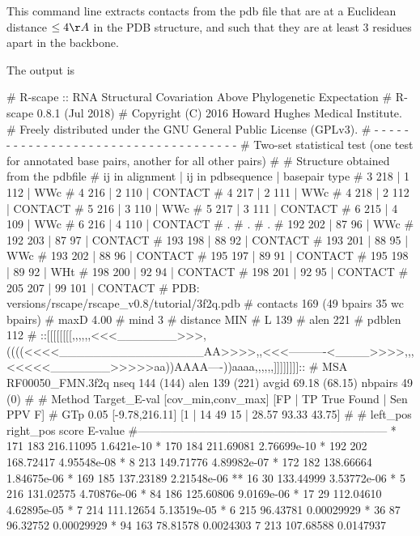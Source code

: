 \noindent
This command line extracts contacts from the pdb file that are at a
Euclidean distance $\leq 4 \AA$ in the PDB structure, and such that
they are at least 3 residues apart in the backbone.


\noindent
The output is

\begin{sreoutput}
# R-scape :: RNA Structural Covariation Above Phylogenetic Expectation
# R-scape 0.8.1 (Jul 2018)
# Copyright (C) 2016 Howard Hughes Medical Institute.
# Freely distributed under the GNU General Public License (GPLv3).
# - - - - - - - - - - - - - - - - - - - - - - - - - - - - - - - - - - - -
# Two-set statistical test (one test for annotated base pairs, another for all other pairs)
#
# Structure obtained from the pdbfile
# ij in alignment | ij in pdbsequence | basepair type
# 3 218 | 1 112 | WWc
# 4 216 | 2 110 | CONTACT
# 4 217 | 2 111 | WWc
# 4 218 | 2 112 | CONTACT
# 5 216 | 3 110 | WWc
# 5 217 | 3 111 | CONTACT
# 6 215 | 4 109 | WWc
# 6 216 | 4 110 | CONTACT
# .
# .
# .
# 192 202 | 87 96 | WWc
# 192 203 | 87 97 | CONTACT
# 193 198 | 88 92 | CONTACT
# 193 201 | 88 95 | WWc
# 193 202 | 88 96 | CONTACT
# 195 197 | 89 91 | CONTACT
# 195 198 | 89 92 | WHt
# 198 200 | 92 94 | CONTACT
# 198 201 | 92 95 | CONTACT
# 205 207 | 99 101 | CONTACT
# PDB:      versions/rscape/rscape_v0.8/tutorial/3f2q.pdb
# contacts  169 (49 bpairs 35 wc bpairs)
# maxD      4.00
# mind      3
# distance  MIN
# L         139
# alen      221
# pdblen    112
# ::[[[[[[[[,,,,,,<<<_______>>>,((((<<<<_________________AA>>>>,,<<<----------<____>>>>,,,<<<<<_______>>>>>aa))AAAA----))aaaa,,,,,,]]]]]]]]::
# MSA RF00050_FMN.3f2q nseq 144 (144) alen 139 (221) avgid 69.18 (68.15) nbpairs 49 (0)
#
# Method Target_E-val [cov_min,conv_max] [FP | TP True Found | Sen PPV F] 
# GTp    0.05         [-9.78,216.11]     [1 | 14 49 15 | 28.57 93.33 43.75] 
#
#       left_pos       right_pos        score           E-value
#------------------------------------------------------------------
*	     171	     183	216.11095	1.6421e-10
*	     170	     184	211.69081	2.76699e-10
*	     192	     202	168.72417	4.95548e-08
*	       8	     213	149.71776	4.89982e-07
*	     172	     182	138.66664	1.84675e-06
*	     169	     185	137.23189	2.21548e-06
**	      16	      30	133.44999	3.53772e-06
*	       5	     216	131.02575	4.70876e-06
*	      84	     186	125.60806	9.0169e-06
*	      17	      29	112.04610	4.62895e-05
*	       7	     214	111.12654	5.13519e-05
*	       6	     215	96.43781	0.00029929
*	      36	      87	96.32752	0.00029929
*	      94	     163	78.81578	0.0024303
 	       7	     213	107.68588	0.0147937
\end{sreoutput}

